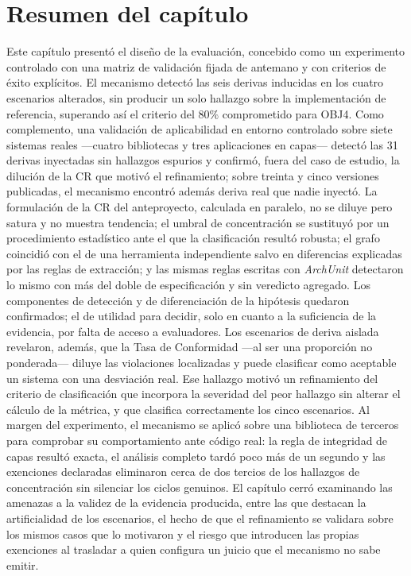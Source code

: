 \section{Resumen del capítulo}
Este capítulo presentó el diseño de la evaluación, concebido como un experimento controlado con una matriz de validación fijada de antemano y con criterios de éxito explícitos. El mecanismo detectó las seis derivas inducidas en los cuatro escenarios alterados, sin producir un solo hallazgo sobre la implementación de referencia, superando así el criterio del $80\%$ comprometido para OBJ4. Como complemento, una validación de aplicabilidad en entorno controlado sobre siete sistemas reales ---cuatro bibliotecas y tres aplicaciones en capas--- detectó las 31 derivas inyectadas sin hallazgos espurios y confirmó, fuera del caso de estudio, la dilución de la CR que motivó el refinamiento; sobre treinta y cinco versiones publicadas, el mecanismo encontró además deriva real que nadie inyectó. La formulación de la CR del anteproyecto, calculada en paralelo, no se diluye pero satura y no muestra tendencia; el umbral de concentración se sustituyó por un procedimiento estadístico ante el que la clasificación resultó robusta; el grafo coincidió con el de una herramienta independiente salvo en diferencias explicadas por las reglas de extracción; y las mismas reglas escritas con \textit{ArchUnit} detectaron lo mismo con más del doble de especificación y sin veredicto agregado. Los componentes de detección y de diferenciación de la hipótesis quedaron confirmados; el de utilidad para decidir, solo en cuanto a la suficiencia de la evidencia, por falta de acceso a evaluadores. Los escenarios de deriva aislada revelaron, además, que la Tasa de Conformidad ---al ser una proporción no ponderada--- diluye las violaciones localizadas y puede clasificar como aceptable un sistema con una desviación real. Ese hallazgo motivó un refinamiento del criterio de clasificación que incorpora la severidad del peor hallazgo sin alterar el cálculo de la métrica, y que clasifica correctamente los cinco escenarios. Al margen del experimento, el mecanismo se aplicó sobre una biblioteca de terceros para comprobar su comportamiento ante código real: la regla de integridad de capas resultó exacta, el análisis completo tardó poco más de un segundo y las exenciones declaradas eliminaron cerca de dos tercios de los hallazgos de concentración sin silenciar los ciclos genuinos. El capítulo cerró examinando las amenazas a la validez de la evidencia producida, entre las que destacan la artificialidad de los escenarios, el hecho de que el refinamiento se validara sobre los mismos casos que lo motivaron y el riesgo que introducen las propias exenciones al trasladar a quien configura un juicio que el mecanismo no sabe emitir.
